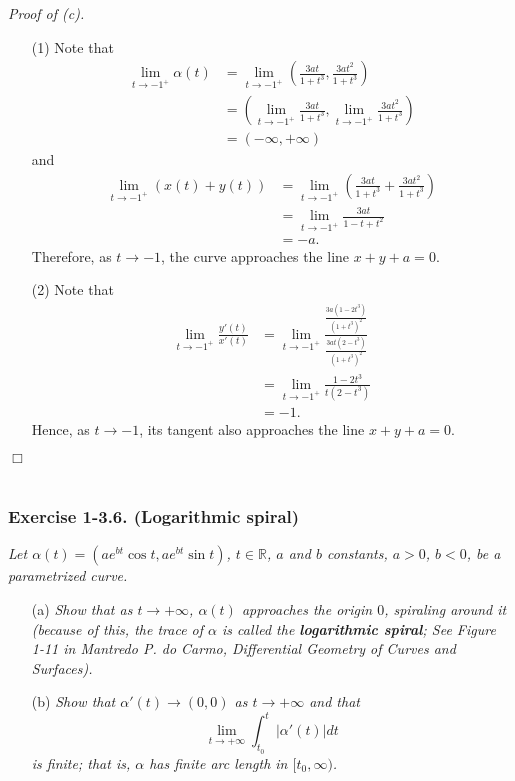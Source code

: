 \documentclass{article}
\begin{document}
\emph{Proof of (c).}
\begin{enumerate}
\item[(1)]
  Note that
  \begin{align*}
    \lim_{t \to -1^{+}} \alpha(t)
    &= \lim_{t \to -1^{+}} \left( \frac{3at}{1+t^3}, \frac{3at^2}{1+t^3} \right) \\
    &= \left( \lim_{t \to -1^{+}} \frac{3at}{1+t^3},
      \lim_{t \to -1^{+}} \frac{3at^2}{1+t^3} \right) \\
    &= (-\infty, +\infty)
  \end{align*}
  and
  \begin{align*}
    \lim_{t \to -1^{+}} (x(t) + y(t))
    &= \lim_{t \to -1^{+}} \left( \frac{3at}{1+t^3} + \frac{3at^2}{1+t^3} \right) \\
    &= \lim_{t \to -1^{+}} \frac{3at}{1-t+t^2} \\
    &= -a.
  \end{align*}
  Therefore, as $t \to -1$, the curve approaches the line $x+y+a=0$.

\item[(2)]
  Note that
  \begin{align*}
    \lim_{t \to -1^{+}} \frac{y'(t)}{x'(t)}
    &= \lim_{t \to -1^{+}} \frac{\frac{3a(1-2t^3)}{(1+t^3)^2}}{\frac{3at(2-t^3)}{(1+t^3)^2}} \\
    &= \lim_{t \to -1^{+}} \frac{1-2t^3}{t(2-t^3)} \\
    &= -1.
  \end{align*}
  Hence, as $t \to -1$, its tangent also approaches the line $x+y+a=0$.
\end{enumerate}
$\Box$ \\\\






\subsubsection*{Exercise 1-3.6. (Logarithmic spiral)}
\emph{Let $\alpha(t) = (ae^{bt} \cos t, ae^{bt} \sin t)$, $t \in \mathbb{R}$,
$a$ and $b$ constants, $a > 0$, $b < 0$, be a parametrized curve.}
\begin{enumerate}
\item[(a)]
  \emph{Show that as $t \to +\infty$, $\alpha(t)$ approaches the origin $0$,
  spiraling around it (because of this, the trace of $\alpha$ is called the \textbf{logarithmic spiral};
  See Figure 1-11 in Mantredo P. do Carmo, Differential Geometry of Curves and Surfaces).}

\item[(b)]
  \emph{Show that $\alpha'(t) \to (0,0)$ as $t \to +\infty$ and that
  \[
    \lim_{t \to + \infty} \int_{t_0}^{t} |\alpha'(t)| dt
  \]
  is finite; that is, $\alpha$ has finite arc length in $[t_0,\infty)$.} \\
\end{enumerate}
\end{document}
